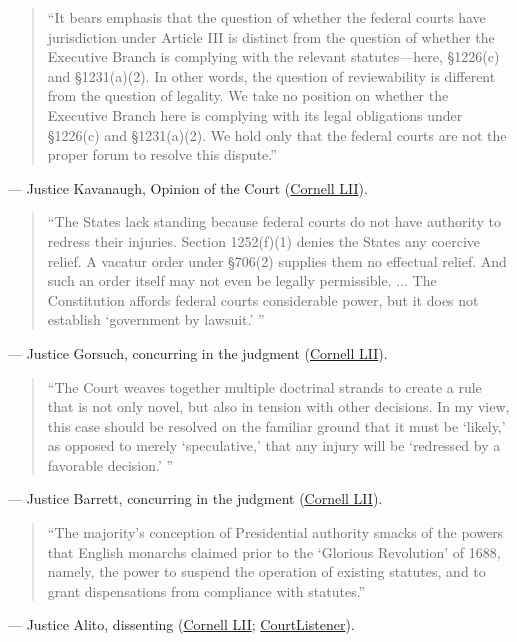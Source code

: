 \documentclass[12pt]{article}
\begin{document}
\begin{quote}
``It bears emphasis that the question of whether the federal courts have jurisdiction under Article III is distinct from the question of whether the Executive Branch is complying with the relevant statutes---here, \S 1226(c) and \S 1231(a)(2). In other words, the question of reviewability is different from the question of legality. We take no position on whether the Executive Branch here is complying with its legal obligations under \S 1226(c) and \S 1231(a)(2). We hold only that the federal courts are not the proper forum to resolve this dispute.''
\end{quote}
\noindent --- Justice Kavanaugh, Opinion of the Court (\href{https://www.law.cornell.edu/supremecourt/text/22-58}{Cornell LII}).

\begin{quote}
``The States lack standing because federal courts do not have authority to redress their injuries. Section 1252(f)(1) denies the States any coercive relief. A vacatur order under \S 706(2) supplies them no effectual relief. And such an order itself may not even be legally permissible. ... The Constitution affords federal courts considerable power, but it does not establish `government by lawsuit.' ''
\end{quote}
\noindent --- Justice Gorsuch, concurring in the judgment (\href{https://www.law.cornell.edu/supremecourt/text/22-58}{Cornell LII}).

\begin{quote}
``The Court weaves together multiple doctrinal strands to create a rule that is not only novel, but also in tension with other decisions. In my view, this case should be resolved on the familiar ground that it must be `likely,' as opposed to merely `speculative,' that any injury will be `redressed by a favorable decision.' ''
\end{quote}
\noindent --- Justice Barrett, concurring in the judgment (\href{https://www.law.cornell.edu/supremecourt/text/22-58}{Cornell LII}).

\begin{quote}
``The majority's conception of Presidential authority smacks of the powers that English monarchs claimed prior to the `Glorious Revolution' of 1688, namely, the power to suspend the operation of existing statutes, and to grant dispensations from compliance with statutes.''
\end{quote}
\noindent --- Justice Alito, dissenting (\href{https://www.law.cornell.edu/supremecourt/text/22-58}{Cornell LII}; \href{https://www.courtlistener.com/opinion/10049663/united-states-v-texas/}{CourtListener}).
\end{document}
